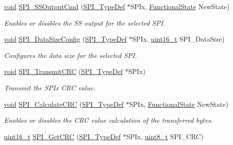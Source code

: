\begin{DoxyCompactItemize}
\hyperlink{usb__devapi_8h_afabf60e7f57651d6d595a02c75f07cd0}{void} \hyperlink{group___s_p_i___private___functions_ga4ec54abdedf6cd17403d853a926d91c1}{S\+P\+I\+\_\+\+S\+S\+Output\+Cmd} (\hyperlink{struct_s_p_i___type_def}{S\+P\+I\+\_\+\+Type\+Def} $\ast$S\+P\+Ix, \hyperlink{agilefox_2library_2inc_2stm32f10x__type_8h_ac9a7e9a35d2513ec15c3b537aaa4fba1}{Functional\+State} New\+State)
\begin{DoxyCompactList}\small\item\em Enables or disables the SS output for the selected S\+PI. \end{DoxyCompactList}\item 
\hyperlink{usb__devapi_8h_afabf60e7f57651d6d595a02c75f07cd0}{void} \hyperlink{group___s_p_i___private___functions_gafc82e90841d7879535d655c035709cb1}{S\+P\+I\+\_\+\+Data\+Size\+Config} (\hyperlink{struct_s_p_i___type_def}{S\+P\+I\+\_\+\+Type\+Def} $\ast$S\+P\+Ix, \hyperlink{_p_e___types_8h_a1f1825b69244eb3ad2c7165ddc99c956}{uint16\+\_\+t} S\+P\+I\+\_\+\+Data\+Size)
\begin{DoxyCompactList}\small\item\em Configures the data size for the selected S\+PI. \end{DoxyCompactList}\item 
\hyperlink{usb__devapi_8h_afabf60e7f57651d6d595a02c75f07cd0}{void} \hyperlink{group___s_p_i___private___functions_gace8b1058e09bab150b0dbe5978810273}{S\+P\+I\+\_\+\+Transmit\+C\+RC} (\hyperlink{struct_s_p_i___type_def}{S\+P\+I\+\_\+\+Type\+Def} $\ast$S\+P\+Ix)
\begin{DoxyCompactList}\small\item\em Transmit the S\+P\+Ix C\+RC value. \end{DoxyCompactList}\item 
\hyperlink{usb__devapi_8h_afabf60e7f57651d6d595a02c75f07cd0}{void} \hyperlink{group___s_p_i___private___functions_ga64f7276d119e6cb58afc100f8832adb0}{S\+P\+I\+\_\+\+Calculate\+C\+RC} (\hyperlink{struct_s_p_i___type_def}{S\+P\+I\+\_\+\+Type\+Def} $\ast$S\+P\+Ix, \hyperlink{agilefox_2library_2inc_2stm32f10x__type_8h_ac9a7e9a35d2513ec15c3b537aaa4fba1}{Functional\+State} New\+State)
\begin{DoxyCompactList}\small\item\em Enables or disables the C\+RC value calculation of the transferred bytes. \end{DoxyCompactList}\item 
\hyperlink{_p_e___types_8h_a1f1825b69244eb3ad2c7165ddc99c956}{uint16\+\_\+t} \hyperlink{group___s_p_i___private___functions_ga4c81c193516e82cf0a2fdc149ef20cc6}{S\+P\+I\+\_\+\+Get\+C\+RC} (\hyperlink{struct_s_p_i___type_def}{S\+P\+I\+\_\+\+Type\+Def} $\ast$S\+P\+Ix, \hyperlink{_p_e___types_8h_aba7bc1797add20fe3efdf37ced1182c5}{uint8\+\_\+t} S\+P\+I\+\_\+\+C\+RC)

\end{DoxyCompactItemize}
